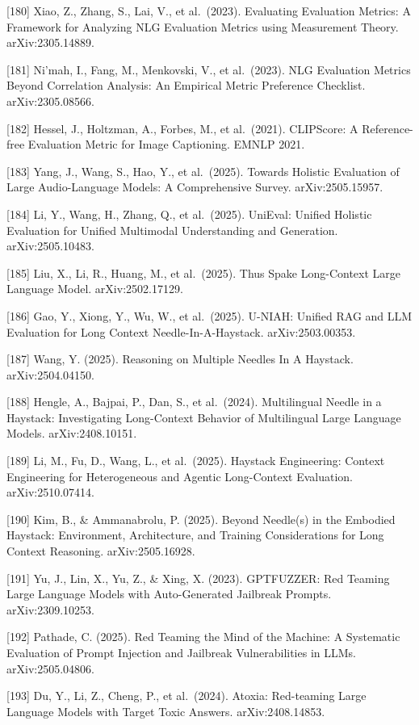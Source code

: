 {[}180{]} Xiao, Z., Zhang, S., Lai, V., et al.~(2023). Evaluating Evaluation Metrics: A Framework for Analyzing NLG Evaluation Metrics using Measurement Theory. arXiv:2305.14889.

{[}181{]} Ni'mah, I., Fang, M., Menkovski, V., et al.~(2023). NLG Evaluation Metrics Beyond Correlation Analysis: An Empirical Metric Preference Checklist. arXiv:2305.08566.

{[}182{]} Hessel, J., Holtzman, A., Forbes, M., et al.~(2021). CLIPScore: A Reference-free Evaluation Metric for Image Captioning. EMNLP 2021.

{[}183{]} Yang, J., Wang, S., Hao, Y., et al.~(2025). Towards Holistic Evaluation of Large Audio-Language Models: A Comprehensive Survey. arXiv:2505.15957.

{[}184{]} Li, Y., Wang, H., Zhang, Q., et al.~(2025). UniEval: Unified Holistic Evaluation for Unified Multimodal Understanding and Generation. arXiv:2505.10483.

{[}185{]} Liu, X., Li, R., Huang, M., et al.~(2025). Thus Spake Long-Context Large Language Model. arXiv:2502.17129.

{[}186{]} Gao, Y., Xiong, Y., Wu, W., et al.~(2025). U-NIAH: Unified RAG and LLM Evaluation for Long Context Needle-In-A-Haystack. arXiv:2503.00353.

{[}187{]} Wang, Y. (2025). Reasoning on Multiple Needles In A Haystack. arXiv:2504.04150.

{[}188{]} Hengle, A., Bajpai, P., Dan, S., et al.~(2024). Multilingual Needle in a Haystack: Investigating Long-Context Behavior of Multilingual Large Language Models. arXiv:2408.10151.

{[}189{]} Li, M., Fu, D., Wang, L., et al.~(2025). Haystack Engineering: Context Engineering for Heterogeneous and Agentic Long-Context Evaluation. arXiv:2510.07414.

{[}190{]} Kim, B., \& Ammanabrolu, P. (2025). Beyond Needle(s) in the Embodied Haystack: Environment, Architecture, and Training Considerations for Long Context Reasoning. arXiv:2505.16928.

{[}191{]} Yu, J., Lin, X., Yu, Z., \& Xing, X. (2023). GPTFUZZER: Red Teaming Large Language Models with Auto-Generated Jailbreak Prompts. arXiv:2309.10253.

{[}192{]} Pathade, C. (2025). Red Teaming the Mind of the Machine: A Systematic Evaluation of Prompt Injection and Jailbreak Vulnerabilities in LLMs. arXiv:2505.04806.

{[}193{]} Du, Y., Li, Z., Cheng, P., et al.~(2024). Atoxia: Red-teaming Large Language Models with Target Toxic Answers. arXiv:2408.14853.

